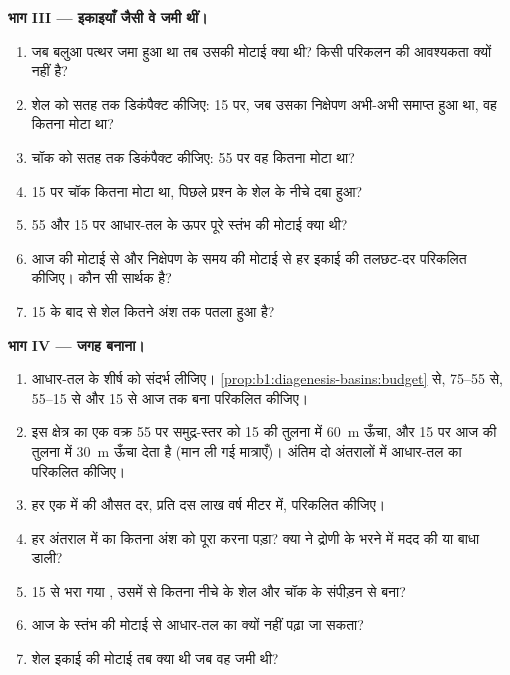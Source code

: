 \begin{problem}
\noindent\textbf{भाग III --- इकाइयाँ जैसी वे जमी थीं।}
\begin{enumerate}[resume]
  \item जब बलुआ पत्थर जमा हुआ था तब उसकी मोटाई क्या थी? किसी परिकलन की आवश्यकता क्यों नहीं है?
  \item शेल को सतह तक डिकंपैक्ट कीजिए: \qty{15}{\Ma} पर, जब उसका निक्षेपण अभी-अभी समाप्त हुआ था, वह कितना मोटा था?
  \item चॉक को सतह तक डिकंपैक्ट कीजिए: \qty{55}{\Ma} पर वह कितना मोटा था?
  \item \qty{15}{\Ma} पर चॉक कितना मोटा था, पिछले प्रश्न के शेल के नीचे दबा हुआ?
  \item \qty{55}{\Ma} और \qty{15}{\Ma} पर आधार-तल के ऊपर पूरे स्तंभ की मोटाई क्या थी?
  \item आज की मोटाई से और निक्षेपण के समय की मोटाई से हर इकाई की तलछट-दर परिकलित कीजिए। कौन सी सार्थक है?
  \item \qty{15}{\Ma} के बाद से शेल कितने अंश तक पतला हुआ है?
\end{enumerate}

\noindent\textbf{भाग IV --- जगह बनाना।}
\begin{enumerate}[resume]
  \item आधार-तल के शीर्ष को संदर्भ लीजिए। \cref{prop:b1:diagenesis-basins:budget} से, \qtyrange{75}{55}{\Ma} से, \qtyrange{55}{15}{\Ma} से और \qty{15}{\Ma} से आज तक बना  परिकलित कीजिए।
  \item इस क्षेत्र का एक  वक्र \qty{55}{\Ma} पर समुद्र-स्तर को \qty{15}{\Ma} की तुलना में \qty{60}{m} ऊँचा, और \qty{15}{\Ma} पर आज की तुलना में \qty{30}{m} ऊँचा देता है (मान ली गई मात्राएँ)। अंतिम दो अंतरालों में आधार-तल का  परिकलित कीजिए।
  \item हर एक में  की औसत दर, प्रति दस लाख वर्ष मीटर में, परिकलित कीजिए।
  \item हर अंतराल में  का कितना अंश  को पूरा करना पड़ा? क्या  ने द्रोणी के भरने में मदद की या बाधा डाली?
  \item \qty{15}{\Ma} से भरा गया , उसमें से कितना नीचे के शेल और चॉक के संपीड़न से बना?
  \item आज के स्तंभ की मोटाई से आधार-तल का  क्यों नहीं पढ़ा जा सकता?
  \item शेल इकाई की मोटाई तब क्या थी जब वह जमी थी?
\end{enumerate}
\end{problem}

